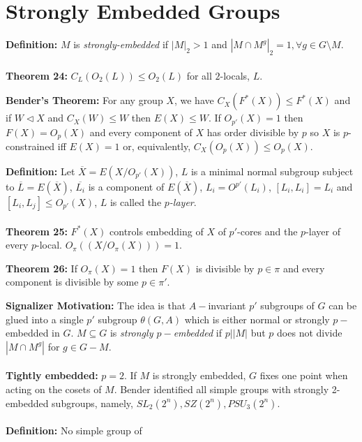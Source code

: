 \section {Strongly Embedded Groups}
{\bf Definition:}  $M$ is \emph{strongly-embedded} if
$|M|_2 > 1$ and $|M \cap M^g|_2=1, \forall g \in G \setminus M$.
\\
\\
{\bf Theorem 24:}
$C_L(O_2(L)) \le O_2(L)$ for all
$2$-locals, $L$.
\begin{quote}
\end{quote}
{\bf Bender's Theorem:} For any group $X$, we have $C_X(F^*(X)) \le F^*(X)$ and if
$W \lhd X$ and $C_X(W) \le W$ then $E(X) \le W$.  If $O_{p'}(X)=1$ then
$F(X)=O_p(X)$ and every component of $X$ has order divisible by $p$ so
$X$ is $p$-constrained iff $E(X)=1$ or, equivalently, $C_X(O_p(X)) \le O_p(X)$.
\begin{quote}
\end{quote}
{\bf Definition:}
Let ${\overline X}= E(X/O_{p'}(X))$, 
$L$ is a minimal normal subgroup subject to ${\overline L}= E({\overline X})$,
${\overline {L_i}}$ is a component of $E({\overline X})$, $L_i= O^{p'}(L_i)$,
$[L_i, L_i]= L_i$ and $[L_i, L_j] \le O_{p'}(X)$, 
$L$ is called the \emph{ $p$-layer}. 
\\
\\
{\bf Theorem 25:}
$F^*(X)$ controls embedding of $X$ of
$p'$-cores and the $p$-layer of every $p$-local.  $O_{\pi}((X/O_{\pi}(X)))=1$.
\begin{quote}
\end{quote}
{\bf Theorem 26:}
If $O_{\pi}(X)=1$ then $F(X)$ is divisible by $p \in \pi$ and every component is
divisible by some $p \in \pi'$.
\begin{quote}
\end{quote}
{\bf Signalizer Motivation:}  The idea is that
$A-$invariant $p'$ subgroups of $G$ can be glued into a single $p'$
subgroup $\theta(G,A)$ which is either normal or strongly $p-$embedded in $G$.
$M \subseteq G$ is \emph{ strongly $p-$embedded} if $p | |M|$ but $p$ does not divide
$|M \cap M^g |$ for $g \in G-M$.
\\
\\
{\bf Tightly embedded:} $p=2$. If $M$ is strongly
embedded, $G$ fixes one point when acting on the cosets of $M$.
Bender identified all simple groups with strongly 2-embedded subgroups, namely,
$SL_2(2^n), SZ(2^n), PSU_3(2^n)$.
\\
\\
{\bf Definition:}
No simple group of
